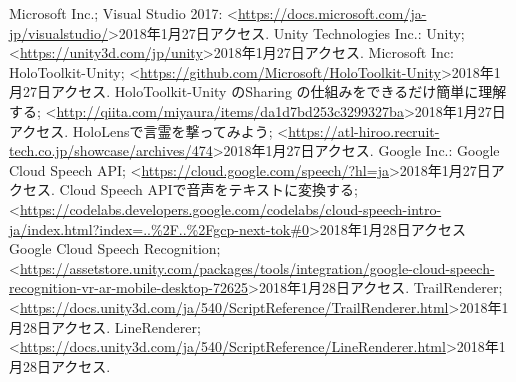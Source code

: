 \documentclass[11pt,a4j, titlepage]{jarticle} %
\begin{document}
\begin{thebibliography}{数字}
   Microsoft Inc.; Visual Studio 2017: \textless\url{https://docs.microsoft.com/ja-jp/visualstudio/}\textgreater2018年1月27日アクセス.
   Unity Technologies Inc.: Unity;  \textless\url{https://unity3d.com/jp/unity}\textgreater2018年1月27日アクセス.
   Microsoft Inc: HoloToolkit-Unity; \textless\url{https://github.com/Microsoft/HoloToolkit-Unity}\textgreater2018年1月27日アクセス.
   HoloToolkit-Unity のSharing の仕組みをできるだけ簡単に理解する; \textless\url{http://qiita.com/miyaura/items/da1d7bd253c3299327ba}\textgreater2018年1月27日アクセス.
   HoloLensで言霊を撃ってみよう;  \textless\url{https://atl-hiroo.recruit-tech.co.jp/showcase/archives/474}\textgreater2018年1月27日アクセス.
   Google Inc.: Google Cloud Speech API; \textless\url{https://cloud.google.com/speech/?hl=ja}\textgreater2018年1月27日アクセス.
   Cloud Speech APIで音声をテキストに変換する; \textless\url{https://codelabs.developers.google.com/codelabs/cloud-speech-intro-ja/index.html?index=..\%2F..\%2Fgcp-next-tok\#0}\textgreater2018年1月28日アクセス
   Google Cloud Speech Recognition;  \textless\url{https://assetstore.unity.com/packages/tools/integration/google-cloud-speech-recognition-vr-ar-mobile-desktop-72625}\textgreater2018年1月28日アクセス.
   TrailRenderer; \textless\url{https://docs.unity3d.com/ja/540/ScriptReference/TrailRenderer.html}\textgreater2018年1月28日アクセス.
   LineRenderer; \textless\url{https://docs.unity3d.com/ja/540/ScriptReference/LineRenderer.html}\textgreater2018年1月28日アクセス.
\end{thebibliography}
\end{document}
